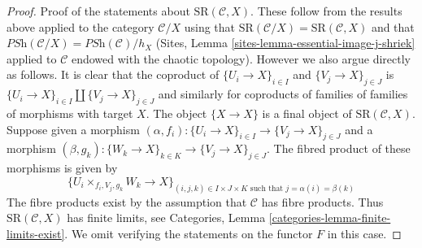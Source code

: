 \documentclass[10pt,a4paper]{amsart}
\theoremstyle{plain}
\theoremstyle{definition}
\theoremstyle{remark}
\numberwithin{equation}{subsection}
\begin{document}
\begin{proof}
\medskip\noindent
Proof of the statements about $\text{SR}(\mathcal{C}, X)$.
These follow from the results above applied to the category
$\mathcal{C}/X$ using that
$\text{SR}(\mathcal{C}/X) = \text{SR}(\mathcal{C}, X)$ and that
$\textit{PSh}(\mathcal{C}/X) = \textit{PSh}(\mathcal{C})/h_X$
(Sites, Lemma \ref{sites-lemma-essential-image-j-shriek} applied
to $\mathcal{C}$ endowed with the chaotic topology). However
we also argue directly as follows.
It is clear that the coproduct of
$\{U_i \to X\}_{i \in I}$ and $\{V_j \to X\}_{j \in J}$
is $\{U_i \to X\}_{i \in I} \amalg \{V_j \to X\}_{j \in J}$
and similarly for coproducts of
families of families of morphisms with target $X$.
The object $\{X \to X\}$ is a final
object of $\text{SR}(\mathcal{C}, X)$.
Suppose given a morphism
$(\alpha, f_i) : \{U_i \to X\}_{i \in I} \to \{V_j \to X\}_{j \in J}$
and a morphism
$(\beta, g_k) : \{W_k \to X\}_{k \in K} \to \{V_j \to X\}_{j \in J}$.
The fibred product of these morphisms is given by
$$
\{ U_i \times_{f_i, V_j, g_k} W_k \to X \}_{(i, j, k) \in I \times J \times K
\text{ such that } j = \alpha(i) = \beta(k)}
$$
The fibre products exist by the assumption that
$\mathcal{C}$ has fibre products.
Thus $\text{SR}(\mathcal{C}, X)$ has finite limits,
see Categories, Lemma \ref{categories-lemma-finite-limits-exist}.
We omit verifying the statements on the functor $F$ in this case.
\end{proof}
\end{document}

